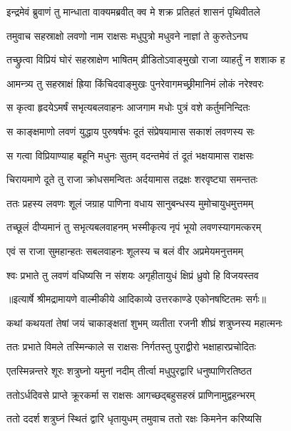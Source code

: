 \twolineshloka
{इन्द्रमेवं ब्रुवाणं तु मान्धाता वाक्यमब्रवीत्}
{क्व मे शक्र प्रतिहतं शासनं पृथिवीतले} %

\twolineshloka
{तमुवाच सहस्राक्षो लवणो नाम राक्षसः}
{मधुपुत्रो मधुवने नाज्ञां ते कुरुतेऽनघ} %

\twolineshloka
{तच्छ्रुत्वा विप्रियं घोरं सहस्राक्षेण भाषितम्}
{व्रीडितोऽवाङ्मुखो राजा व्याहर्तुं न शशाक ह} %

\twolineshloka
{आमन्त्र्य तु सहस्राक्षं ह्रिया किंचिदवाङ्मुखः}
{पुनरेवागमच्छ्रीमानिमं लोकं नरेश्वरः} %

\twolineshloka
{स कृत्वा हृदयेऽमर्षं सभृत्यबलवाहनः}
{आजगाम मधोः पुत्रं वशे कर्तुमनिन्दितः} %

\twolineshloka
{स काङ्क्षमाणो लवणं युद्धाय पुरुषर्षभः}
{दूतं संप्रेषयामास सकाशं लवणस्य सः} %

\twolineshloka
{स गत्वा विप्रियाण्याह बहूनि मधुनः सुतम्}
{वदन्तमेवं तं दूतं भक्षयामास राक्षसः} %

\twolineshloka
{चिरायमाणे दूते तु राजा क्रोधसमन्वितः}
{अर्दयामास तद्रक्षः शरवृष्ट्या समन्ततः} %

\twolineshloka
{ततः प्रहस्य लवणः शूलं जग्राह पाणिना}
{वधाय सानुबन्धस्य मुमोचायुधमुत्तमम्} %

\twolineshloka
{तच्छूलं दीप्यमानं तु सभृत्यबलवाहनम्}
{भस्मीकृत्य नृपं भूयो लवणस्यागमत्करम्} %

\twolineshloka
{एवं स राजा सुमहान्हतः सबलवाहनः}
{शूलस्य च बलं वीर अप्रमेयमनुत्तमम्} %

\twolineshloka
{श्वः प्रभाते तु लवणं वधिष्यसि न संशयः}
{अगृहीतायुधं क्षिप्रं ध्रुवो हि विजयस्तव} %


{॥इत्यार्षे श्रीमद्रामायणे वाल्मीकीये आदिकाव्ये उत्तरकाण्डे एकोनषष्टितमः सर्गः॥}


\twolineshloka
{कथां कथयतां तेषां जयं चाकाङ्क्षतां शुभम्}
{व्यतीता रजनी शीघ्रं शत्रुघ्नस्य महात्मनः} %

\twolineshloka
{ततः प्रभाते विमले तस्मिन्काले स राक्षसः}
{निर्गतस्तु पुराद्वीरो भक्षाहारप्रचोदितः} %

\twolineshloka
{एतस्मिन्नन्तरे शूरः शत्रुघ्नो यमुनां नदीम्}
{तीर्त्वा मधुपुरद्वारि धनुष्पाणिरतिष्ठत} %

\twolineshloka
{ततोऽर्धदिवसे प्राप्ते क्रूरकर्मा स राक्षसः}
{आगच्छद्बहुसहस्रं प्राणिनामुद्वहन्भरम्} %

\twolineshloka
{ततो ददर्श शत्रुघ्नं स्थितं द्वारि धृतायुधम्}
{तमुवाच ततो रक्षः किमनेन करिष्यसि} %

